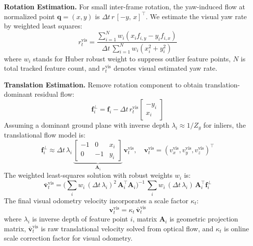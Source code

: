 \textbf{Rotation Estimation.} For small inter-frame rotation, the yaw-induced flow at normalized point $\mathbf{q}=(x,y)$ is $\Delta t\,r\,[-y,\,x]^\top$. We estimate the visual yaw rate by weighted least squares:
\begin{equation}
    r^\mathrm{vis}_t=\frac{\sum_{i=1}^N w_i(x_i f_{i,y}-y_i f_{i,x})}{\Delta t\,\sum_{i=1}^N w_i(x_i^2+y_i^2)}
\end{equation}
where $w_i$ stands for Huber robust weight to suppress outlier feature points, $N$ is total tracked feature count, and $r_t^\mathrm{vis}$ denotes visual estimated yaw rate.

\textbf{Translation Estimation.} Remove rotation component to obtain trans\-la\-tion-dom\-i\-nant residual flow:
\begin{equation}
    \mathbf{f}_i^{\perp}=\mathbf{f}_i-\Delta t\,r^\mathrm{vis}_t\begin{bmatrix}-y_i\\ x_i\end{bmatrix}
\end{equation}
Assuming a dominant ground plane with inverse depth $\lambda_i\approx 1/Z_g$ for inliers, the translational flow model is:
\begin{equation}
    \mathbf{f}_i^{\perp}\approx \Delta t\,\lambda_i\,\underbrace{\begin{bmatrix}-1 & 0 & x_i\\ 0 & -1 & y_i\end{bmatrix}}_{\mathbf{A}_i}\,\mathbf{v}^\mathrm{vis}_t,\quad \mathbf{v}^\mathrm{vis}_t=(v_x^\mathrm{vis}, v_y^\mathrm{vis}, v_z^\mathrm{vis})^\top
\end{equation}
The weighted least-squares solution with robust weights $w_i$ is:
\begin{equation}
    \bar{\mathbf{v}}^\mathrm{vis}_t=\Big(\sum_i w_i\,(\Delta t\,\lambda_i)^2\,\mathbf{A}_i^\top\mathbf{A}_i\Big)^{-1}\,\sum_i w_i\,(\Delta t\,\lambda_i)\,\mathbf{A}_i^\top\mathbf{f}_i^{\perp}
\end{equation}
The final visual odometry velocity incorporates a scale factor $\kappa_t$:
\begin{equation}
    \mathbf{v}^\mathrm{vis}_t=\kappa_t\,\bar{\mathbf{v}}^\mathrm{vis}_t
\end{equation}
where $\lambda_i$ is inverse depth of feature point $i$, matrix $\mathbf{A}_i$ is geometric projection matrix, $\bar{\mathbf{v}}_t^\mathrm{vis}$ is raw translational velocity solved from optical flow, and $\kappa_t$ is online scale correction factor for visual odometry.

